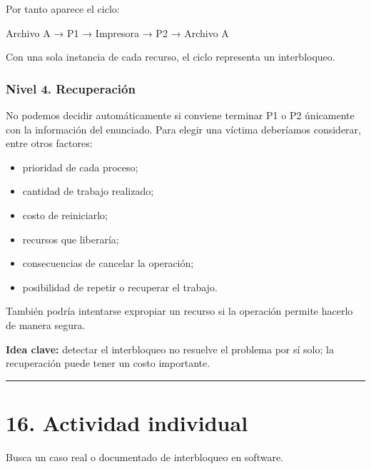 \documentclass[
  spanish,
  letterpaper,
]{scrbook}
\newenvironment{Shaded}{\begin{snugshade}}{\end{snugshade}}
\newcommand{\NormalTok}[1]{\textcolor[rgb]{0.00,0.23,0.31}{#1}}
\providecommand{\tightlist}{%
  \setlength{\itemsep}{0pt}\setlength{\parskip}{0pt}}
\begin{document}
\begin{tcolorbox}
Por tanto aparece el ciclo:

\begin{Shaded}
\begin{Highlighting}[]
\NormalTok{Archivo A → P1 → Impresora → P2 → Archivo A}
\end{Highlighting}
\end{Shaded}

Con una sola instancia de cada recurso, el ciclo representa un
interbloqueo.

\subsection{Nivel 4. Recuperación}\label{nivel-4.-recuperaciuxf3n-1}

No podemos decidir automáticamente si conviene terminar P1 o P2
únicamente con la información del enunciado. Para elegir una víctima
deberíamos considerar, entre otros factores:

\begin{itemize}
\tightlist
\item
  prioridad de cada proceso;
\item
  cantidad de trabajo realizado;
\item
  costo de reiniciarlo;
\item
  recursos que liberaría;
\item
  consecuencias de cancelar la operación;
\item
  posibilidad de repetir o recuperar el trabajo.
\end{itemize}

También podría intentarse expropiar un recurso si la operación permite
hacerlo de manera segura.

\textbf{Idea clave:} detectar el interbloqueo no resuelve el problema
por sí solo; la recuperación puede tener un costo importante.

\end{tcolorbox}

\begin{center}\rule{0.5\linewidth}{0.5pt}\end{center}


\chapter{16. Actividad individual}\label{actividad-individual}

Busca un caso real o documentado de interbloqueo en software.
\end{document}
